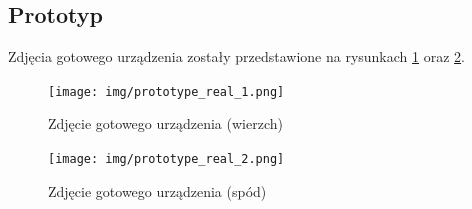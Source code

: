     
    \subsection{Prototyp}
    Zdjęcia  gotowego urządzenia zostały przedstawione na rysunkach \ref{fig:prototype_real_1} oraz \ref{fig:prototype_real_2}.
    
    \begin{figure}[ht]
        \centering
        \texttt{[image: img/prototype\_real\_1.png]}
        \caption{Zdjęcie gotowego urządzenia (wierzch)}
        \label{fig:prototype_real_1}
    \end{figure}
    
    \begin{figure}[ht]
        \centering
        \texttt{[image: img/prototype\_real\_2.png]}
        \caption{Zdjęcie gotowego urządzenia (spód)}
        \label{fig:prototype_real_2}
    \end{figure}